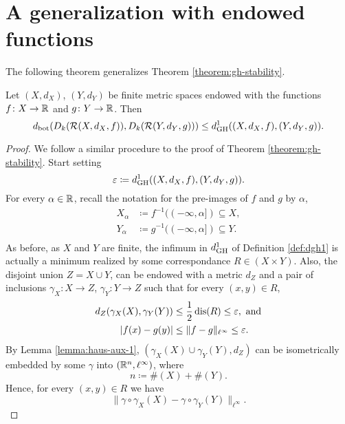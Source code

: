\section{A generalization with endowed functions}

The following theorem generalizes Theorem \ref{theorem:gh-stability}.

\begin{theorem}
    Let $ (X, d_X) $, $ (Y, d_Y) $ be finite metric spaces endowed with the functions $ f \colon X \to \mathbb R $ and $ g \colon Y \to \mathbb R $. Then
    \begin{equation}
        d_{\operatorname{bot}}(D_k(\mathcal{R}(X, d_X, f)), D_k(\mathcal{R}(Y, d_Y, g))) \leq d_{\operatorname{GH}}^1((X, d_X, f), (Y, d_Y, g)).
    \end{equation}
\end{theorem}
\begin{proof}
    We follow a similar procedure to the proof of Theorem \ref{theorem:gh-stability}. Start setting
    \begin{equation}
        \varepsilon \coloneq d_{\operatorname{GH}}^1((X, d_X, f), (Y, d_Y, g)).
    \end{equation}
    For every $ \alpha \in \mathbb R $, recall the notation for the pre-images of $ f $ and $ g $ by $ \alpha $,
    \begin{align}
        X_\alpha &\coloneq f^{-1}((-\infty, \alpha]) \subseteq X, \\
        Y_\alpha &\coloneq g^{-1}((-\infty, \alpha]) \subseteq Y. \\
    \end{align}
    As before, as $ X $ and $ Y $ are finite, the infimum in $ d_{\operatorname{GH}}^1 $ of Definition \ref{def:dgh1} is actually a minimum realized by some correspondance $ R \in (X \times Y) $. Also, the disjoint union $ Z = X \cup Y $, can be endowed with a metric $ d_Z $ and a pair of inclusions $ \gamma_X \colon X \to Z $, $ \gamma_Y \colon Y \to Z $ such that for every $ (x, y) \in R $, 
    \begin{align}
        d_Z(\gamma_X(X), \gamma_Y(Y)) &\leq \frac{1}{2} \operatorname{dis}(R) \leq \varepsilon, \text{ and} \\
        |f(x) - g(y)| &\leq \|f-g\|_{\ell^\infty} \leq \varepsilon.
    \end{align}
    By Lemma \ref{lemma:haus-aux-1}, $ (\gamma_X(X) \cup \gamma_Y(Y), d_Z) $ can be isometrically embedded by some $ \gamma $ into $ (\mathbb R^n, \ell^\infty) $, where
    \begin{equation}
        n \coloneq \#(X) + \#(Y).
    \end{equation}
    Hence, for every $ (x, y) \in R $ we have
    \begin{equation}
        \|\gamma \circ \gamma_X(X) - \gamma \circ \gamma_Y(Y) \|_{\ell^\infty}.
    \end{equation}


\end{proof}
